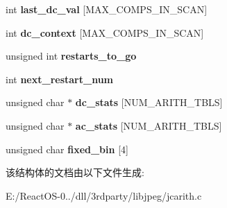 \begin{DoxyCompactItemize}
\mbox{\label{structarith__entropy__encoder_a60ba4c07f691b539ba51a25a20dc38ae}} 
int {\bfseries last\+\_\+dc\+\_\+val} \mbox{[}M\+A\+X\+\_\+\+C\+O\+M\+P\+S\+\_\+\+I\+N\+\_\+\+S\+C\+AN\mbox{]}
\item 
\mbox{\label{structarith__entropy__encoder_a1f8bc39ac0327ddbf46c65434d0ceb75}} 
int {\bfseries dc\+\_\+context} \mbox{[}M\+A\+X\+\_\+\+C\+O\+M\+P\+S\+\_\+\+I\+N\+\_\+\+S\+C\+AN\mbox{]}
\item 
\mbox{\label{structarith__entropy__encoder_add27b20b9b70a05f49c4242844253109}} 
unsigned int {\bfseries restarts\+\_\+to\+\_\+go}
\item 
\mbox{\label{structarith__entropy__encoder_ad523833a7d6fa8c645fb9d18de18b487}} 
int {\bfseries next\+\_\+restart\+\_\+num}
\item 
\mbox{\label{structarith__entropy__encoder_add54e8b278b9eea4aa6ee85ea2de4307}} 
unsigned char $\ast$ {\bfseries dc\+\_\+stats} \mbox{[}N\+U\+M\+\_\+\+A\+R\+I\+T\+H\+\_\+\+T\+B\+LS\mbox{]}
\item 
\mbox{\label{structarith__entropy__encoder_a42b982c858027226af51485fa8b0bf22}} 
unsigned char $\ast$ {\bfseries ac\+\_\+stats} \mbox{[}N\+U\+M\+\_\+\+A\+R\+I\+T\+H\+\_\+\+T\+B\+LS\mbox{]}
\item 
\mbox{\label{structarith__entropy__encoder_a06cb7a9a6db5a785f6630e5b5606ae5d}} 
unsigned char {\bfseries fixed\+\_\+bin} \mbox{[}4\mbox{]}
\end{DoxyCompactItemize}


该结构体的文档由以下文件生成\+:\begin{DoxyCompactItemize}
\item 
E\+:/\+React\+O\+S-\/0../dll/3rdparty/libjpeg/jcarith.\+c\end{DoxyCompactItemize}
